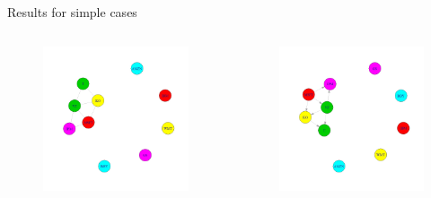 \documentclass{beamer}
\begin{document}
\begin{frame}
\begin{block}{Results for simple cases}
\begin{columns}
\column{1.5in}
\begin{figure}
     \includegraphics[width=1\textwidth, height=0.5\textheight]{10stocks_huge.jpeg}
\end{figure}
\column{1.5in}
\begin{figure}
     \includegraphics[width=1\textwidth, height=0.5\textheight]{10stocks_bn_glasso.jpeg}
\end{figure}
\end{columns}
\end{block}
\end{frame}
\end{document}

